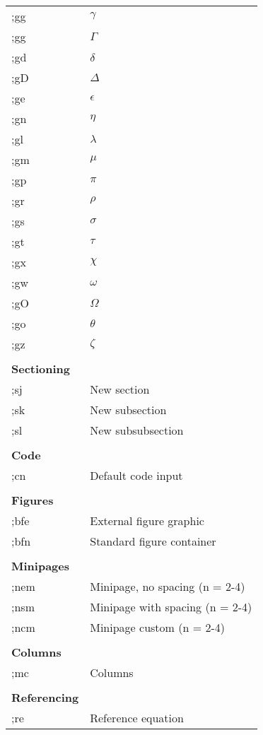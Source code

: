 \documentclass{article}
\begin{document}
\begin{figure}[H]
\begin{minipage}{0.48\textwidth}
\begin{table}[H]
\begin{tabular}{l l}
				;gg	& $\gamma $  \\
				;gg	& $\Gamma $  \\
				;gd	& $\delta $  \\
				;gD	& $\Delta $  \\
				;ge	& $\epsilon $  \\
				;gn	& $\eta $  \\
				;gl	& $\lambda $  \\
				;gm	& $\mu $  \\
				;gp 	& $\pi $  \\
				;gr	& $\rho $ \\
				;gs	& $\sigma $  \\
				;gt	& $\tau  $  \\
				;gx	& $\chi  $  \\
				;gw	& $\omega $  \\
				;gO	& $\Omega $  \\
				;go	& $\theta $  \\
				;gz     & $\zeta $ \\
				&  \\
				\textbf{Sectioning} 	&  \\
				;sj	& New section  \\
				;sk	& New subsection \\
				;sl	& New subsubsection \\
				&  \\
				\textbf{Code} 	&  \\
				;cn	& Default code input \\
				&  \\
				\textbf{Figures} 	&  \\
				;bfe	& External figure graphic \\
				;bfn	& Standard figure container \\
				&  \\
				\textbf{Minipages} 	&  \\
				;nem	& Minipage, no spacing (n = 2-4) \\
				;nsm	& Minipage with spacing (n = 2-4) \\
				;ncm	& Minipage custom (n = 2-4) \\
				&  \\
				\textbf{Columns} 	&  \\
				;mc	& Columns \\
				&  \\
				\textbf{Referencing} 		&  \\
				;re	& Reference equation \\

\end{tabular}
\end{table}
\end{minipage}
\end{figure}
\end{document}
